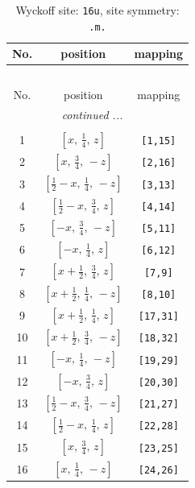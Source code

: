 \documentclass[fleqn,8pt]{jsarticle}
\begin{document}
\begin{longtable}{ccc}
\caption{Wyckoff site: {\tt 16u}, site symmetry: {\tt .m.}}
 \\
 \hline \hline
No. & position & mapping \\ \hline \endfirsthead

\multicolumn{2}{l}{\tablename\ \thetable{}} \\
 \hline \hline
No. & position & mapping \\ \hline \endhead

 \hline \hline
\multicolumn{2}{r}{\footnotesize\it continued ...} \\ \endfoot

 \hline \hline
\multicolumn{2}{r}{} \\ \endlastfoot

1 & $\left[ x,\, \frac{1}{4},\, z \right]$ & {\tt [1,15]} \\ \hline
2 & $\left[ x,\, \frac{3}{4},\, - z \right]$ & {\tt [2,16]} \\ \hline
3 & $\left[ \frac{1}{2} - x,\, \frac{1}{4},\, - z \right]$ & {\tt [3,13]} \\ \hline
4 & $\left[ \frac{1}{2} - x,\, \frac{3}{4},\, z \right]$ & {\tt [4,14]} \\ \hline
5 & $\left[ - x,\, \frac{3}{4},\, - z \right]$ & {\tt [5,11]} \\ \hline
6 & $\left[ - x,\, \frac{1}{4},\, z \right]$ & {\tt [6,12]} \\ \hline
7 & $\left[ x + \frac{1}{2},\, \frac{3}{4},\, z \right]$ & {\tt [7,9]} \\ \hline
8 & $\left[ x + \frac{1}{2},\, \frac{1}{4},\, - z \right]$ & {\tt [8,10]} \\ \hline
9 & $\left[ x + \frac{1}{2},\, \frac{1}{4},\, z \right]$ & {\tt [17,31]} \\ \hline
10 & $\left[ x + \frac{1}{2},\, \frac{3}{4},\, - z \right]$ & {\tt [18,32]} \\ \hline
11 & $\left[ - x,\, \frac{1}{4},\, - z \right]$ & {\tt [19,29]} \\ \hline
12 & $\left[ - x,\, \frac{3}{4},\, z \right]$ & {\tt [20,30]} \\ \hline
13 & $\left[ \frac{1}{2} - x,\, \frac{3}{4},\, - z \right]$ & {\tt [21,27]} \\ \hline
14 & $\left[ \frac{1}{2} - x,\, \frac{1}{4},\, z \right]$ & {\tt [22,28]} \\ \hline
15 & $\left[ x,\, \frac{3}{4},\, z \right]$ & {\tt [23,25]} \\ \hline
16 & $\left[ x,\, \frac{1}{4},\, - z \right]$ & {\tt [24,26]} \\
\end{longtable}
\end{document}
